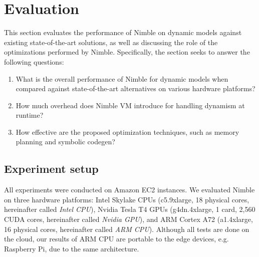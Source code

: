 \vspace{-1.5em}
\section{Evaluation}
\label{sec:eval}

This section evaluates the performance of Nimble on dynamic models against existing state-of-the-art solutions, as well as discussing the role of the optimizations performed by Nimble. Specifically, the section seeks to answer the following questions:
\begin{enumerate}
    \item What is the overall performance of Nimble for dynamic models when compared against state-of-the-art alternatives on various hardware platforms?
    \item How much overhead does Nimble VM introduce for handling dynamism at runtime?
    \item How effective are the proposed optimization techniques, such as memory planning and symbolic codegen?
\end{enumerate}

\subsection{Experiment setup}
\label{sec:eval:setup}

All experiments were conducted on Amazon EC2 instances. We evaluated Nimble on three hardware platforms: Intel Skylake CPUs (c5.9xlarge, 18 physical cores, hereinafter called {\em Intel CPU}), Nvidia Tesla T4 GPUs (g4dn.4xlarge, 1 card, 2,560 CUDA cores, hereinafter called {\em Nvidia GPU}), and ARM Cortex A72 (a1.4xlarge, 16 physical cores, hereinafter called {\em ARM CPU}). Although all tests are done on the cloud, our results of ARM CPU are portable to the edge devices, e.g. Raspberry Pi, due to the same architecture. %

